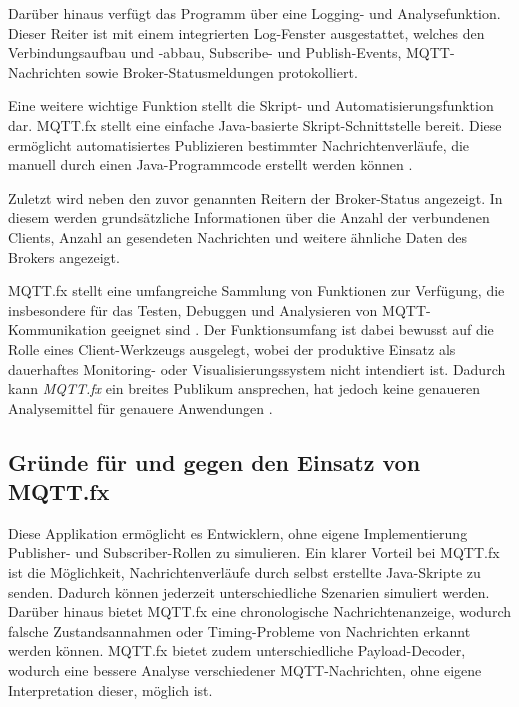         Darüber hinaus verfügt das Programm über eine Logging- und Analysefunktion. Dieser Reiter ist mit einem integrierten Log-Fenster ausgestattet, welches den Verbindungsaufbau und -abbau, Subscribe- und Publish-Events, MQTT-Nachrichten sowie Broker-Statusmeldungen protokolliert. \autocite{ouyangMQTTfxGuideFeatures}

        Eine weitere wichtige Funktion stellt die Skript- und Automatisierungsfunktion dar. MQTT.fx stellt eine einfache Java-basierte Skript-Schnittstelle bereit. 
        Diese ermöglicht automatisiertes Publizieren bestimmter Nachrichtenverläufe, die manuell durch einen Java-Programmcode erstellt werden können \autocite{MQTTTestingDebugging}.

        Zuletzt wird neben den zuvor genannten Reitern der Broker-Status angezeigt. In diesem werden grundsätzliche Informationen über die Anzahl der verbundenen Clients, Anzahl an gesendeten Nachrichten und weitere ähnliche Daten des Brokers angezeigt. \autocite{ouyangMQTTfxGuideFeatures}

        MQTT.fx stellt eine umfangreiche Sammlung von Funktionen zur Verfügung, die insbesondere für das Testen, Debuggen und Analysieren von MQTT-Kommunikation geeignet sind \autocite{MQTTTestingDebugging}. 
        Der Funktionsumfang ist dabei bewusst auf die Rolle eines Client-Werkzeugs ausgelegt, wobei der produktive Einsatz als dauerhaftes Monitoring- oder Visualisierungssystem nicht intendiert ist. Dadurch kann \textit{MQTT.fx} ein breites Publikum ansprechen, hat jedoch keine genaueren Analysemittel für genauere Anwendungen \autocite[13--14]{brooksNoSilverBullet1987}.
    \subsection{Gründe für und gegen den Einsatz von MQTT.fx}
        Diese Applikation ermöglicht es Entwicklern, ohne eigene Implementierung Publisher- und Subscriber-Rollen zu simulieren. 
         Ein klarer Vorteil bei MQTT.fx ist die Möglichkeit, Nachrichtenverläufe durch selbst erstellte Java-Skripte zu senden. Dadurch können jederzeit unterschiedliche Szenarien simuliert werden. Darüber hinaus bietet MQTT.fx eine chronologische Nachrichtenanzeige, wodurch falsche Zustandsannahmen 
        oder Timing-Probleme von Nachrichten erkannt werden können.
        MQTT.fx bietet zudem unterschiedliche Payload-Decoder, wodurch eine bessere Analyse verschiedener MQTT-Nachrichten, ohne eigene Interpretation dieser, möglich 
        ist. \autocite{MQTTTestingDebugging}
         
